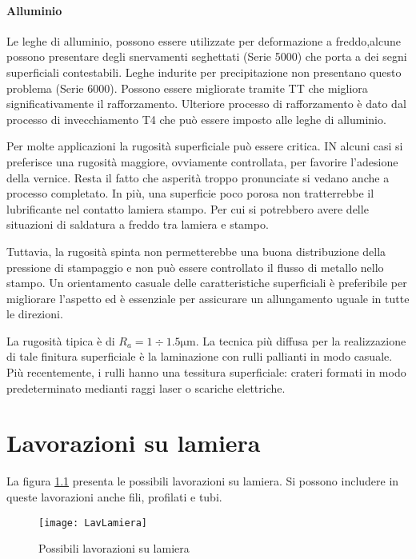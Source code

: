\subsubsection{Alluminio}
Le leghe di alluminio, possono essere utilizzate per deformazione a freddo,alcune possono presentare degli snervamenti seghettati (Serie 5000) che porta a dei segni superficiali contestabili. Leghe indurite per precipitazione non presentano questo problema (Serie 6000).
Possono essere migliorate tramite \ac{TT} che migliora significativamente il rafforzamento. 
Ulteriore processo di rafforzamento è dato dal processo di invecchiamento T4 che può essere imposto alle leghe di alluminio.

Per molte applicazioni la rugosità superficiale può essere critica.
IN alcuni casi si preferisce una rugosità maggiore, ovviamente controllata, per favorire l'adesione della vernice. Resta il fatto che asperità troppo pronunciate si vedano anche a processo completato. In più, una superficie poco porosa non tratterrebbe il lubrificante nel contatto lamiera stampo. Per cui si potrebbero avere delle situazioni di saldatura a freddo tra lamiera e stampo.

Tuttavia, la rugosità spinta non permetterebbe una buona distribuzione della pressione di stampaggio e non può essere controllato il flusso di metallo nello stampo.
Un orientamento casuale delle caratteristiche superficiali è preferibile per migliorare l'aspetto ed è essenziale per assicurare un allungamento uguale in tutte le direzioni.

La rugosità tipica è di $R_a = 1 \div 1.5\unit{\um}$.
La tecnica più diffusa per la realizzazione di tale finitura superficiale è la laminazione con rulli pallianti in modo casuale.
Più recentemente, i rulli hanno una tessitura superficiale: crateri formati in modo predeterminato medianti raggi laser o scariche elettriche.


\chapter{Lavorazioni su lamiera}\label{chp:Lavlamiera}
La figura \ref{fig:LavLamiera} presenta le possibili lavorazioni su lamiera.
Si possono includere in queste lavorazioni anche fili, profilati e tubi.

\begin{figure}
\centering
\texttt{[image: LavLamiera]}
\caption{Possibili lavorazioni su lamiera}
\label{fig:LavLamiera}
\end{figure}

